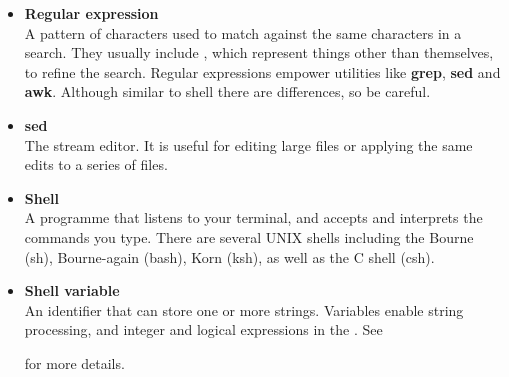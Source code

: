 \documentclass[twoside,11pt,nolof]{starlink}
\begin{document}
\begin{itemize}
\item {\bf\label{sc4_gl_reg_exp}Regular expression}\\
      A pattern of characters used to match against the same
      characters in a search.  They usually include , which represent things other than
      themselves, to refine the search.  Regular expressions empower
      utilities like \textbf{grep}, \textbf{sed} and \textbf{awk}.  Although
      similar to shell  there are
      differences, so be careful.


\item {\bf\label{sc4_gl_sed}sed}\\
      The stream editor.  It is useful for editing large files or
      applying the same edits to a series of files.

\item {\bf\label{sc4_gl_she}Shell}\\
      A programme that listens to your terminal, and accepts and
      interprets the commands you type.  There are several UNIX
      shells including the Bourne (sh), Bourne-again (bash),
      Korn (ksh), as well as the C shell (csh).

\item {\bf\label{sc4_gl_she_var}Shell variable}\\
      An identifier that can store one or more strings.  Variables
      enable string processing, and integer and logical expressions
      in the .  See
\begin{htmlonly}
\end{htmlonly}
       for more details.


\end{itemize}
\end{document}
